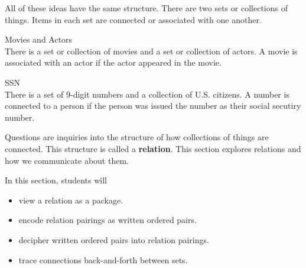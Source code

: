 \documentclass{ximera}
\begin{document}
All of these ideas have the same structure.  There are two sets or collections of things.  Items in each set are connected or associated with one another.



\begin{example} Movies and Actors \\
There is a set or collection of movies and a set or collection of actors.  A movie is associated with an actor if the actor appeared in the movie.
\end{example}

\begin{example} SSN \\
There is a set of 9-digit numbers and a collection of U.S. citizens.  A number is connected to a person if the person was issued the number as their social secutiry number.
\end{example}


Questions are inquiries into the structure of how collections of things are connected. This structure is called a \textbf{relation}. This section explores relations and how we communicate about them.











\begin{sectionOutcomes}
In this section, students will 

\begin{itemize}
\item view a relation as a package.
\item encode relation pairings as written ordered pairs.
\item decipher written ordered pairs into relation pairings.
\item trace connections back-and-forth between sets.
\end{itemize}
\end{sectionOutcomes}
\end{document}
